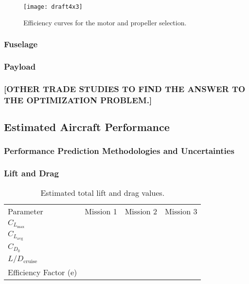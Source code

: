 \begin{figure}[h!]
	\centering
	\texttt{[image: draft4x3]}
	\caption{Efficiency curves for the motor and propeller selection.}
	\label{fig:propefficiency}
\end{figure}



\subsubsection{Fuselage}



\subsubsection{Payload}

\subsubsection{\color{\BYUred} [OTHER TRADE STUDIES TO FIND THE ANSWER TO THE OPTIMIZATION PROBLEM.]}



\subsection{Estimated Aircraft Performance}
\label{ssec:estaircraftperfomance}


\subsubsection{Performance Prediction Methodologies and Uncertainties}
\label{sssec:uncertaintyanalysis}



\subsubsection{Lift and Drag}
\label{sssec:liftdrag}

\begin{table}[h!]
	\centering
	\caption{Estimated total lift and drag values.}
	\label{tab:estimatedLD}
	\begin{tabular}{ C{1in}  C{1in}  C{1in}  C{1in}}
		
		Parameter & Mission 1 & Mission 2 & Mission 3 \\
		
		\(C_{L_\text{max}}\) & & &\\
		
		\(C_{L_\text{avg}}\) & & &\\
		
		\(C_{D_0}\) & & &\\
		
		\(L/D_\text{cruise}\) & & &\\
		
		Efficiency Factor (e) & & & \\
		
	\end{tabular}
\end{table}


